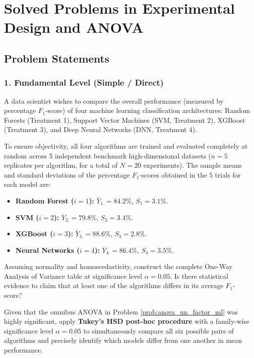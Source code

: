 \section{Solved Problems in Experimental Design and ANOVA}

\subsection{Problem Statements}

\subsubsection*{1. Fundamental Level (Simple / Direct)}

\begin{problema}
	\label{prob:anova_un_factor_ml}
	A data scientist wishes to compare the overall performance (measured by percentage $F_1$-score) of four machine learning classification architectures: Random Forests (Treatment 1), Support Vector Machines (SVM, Treatment 2), XGBoost (Treatment 3), and Deep Neural Networks (DNN, Treatment 4).
	
	To ensure objectivity, all four algorithms are trained and evaluated completely at random across 5 independent benchmark high-dimensional datasets ($n = 5$ replicates per algorithm, for a total of $N = 20$ experiments). The sample means and standard deviations of the percentage $F_1$-scores obtained in the 5 trials for each model are:
	\begin{itemize}
		\item \textbf{Random Forest ($i=1$):} $\bar{Y}_{1.} = 84.2\%$, $S_1 = 3.1\%$.
		\item \textbf{SVM ($i=2$):} $\bar{Y}_{2.} = 79.8\%$, $S_2 = 3.4\%$.
		\item \textbf{XGBoost ($i=3$):} $\bar{Y}_{3.} = 88.6\%$, $S_3 = 2.8\%$.
		\item \textbf{Neural Networks ($i=4$):} $\bar{Y}_{4.} = 86.4\%$, $S_4 = 3.5\%$.
	\end{itemize}
	Assuming normality and homoscedasticity, construct the complete One-Way Analysis of Variance table at significance level $\alpha = 0.05$. Is there statistical evidence to claim that at least one of the algorithms differs in its average $F_1$-score?
\end{problema}

\begin{problema}
	\label{prob:posthoc_tukey_ml}
	Given that the omnibus ANOVA in Problem \ref{prob:anova_un_factor_ml} was highly significant, apply \textbf{Tukey's HSD post-hoc procedure} with a family-wise significance level $\alpha = 0.05$ to simultaneously compare all six possible pairs of algorithms and precisely identify which models differ from one another in mean performance.
\end{problema}

